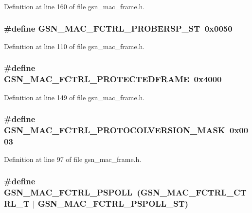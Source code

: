 Definition at line 160 of file gsn\_\-mac\_\-frame.h.

\hypertarget{a00523_a3fb1b989d878e7430e1b10bde689a86f}{
\subsubsection[{GSN\_\-MAC\_\-FCTRL\_\-PROBERSP\_\-ST}]{\setlength{\rightskip}{0pt plus 5cm}\#define GSN\_\-MAC\_\-FCTRL\_\-PROBERSP\_\-ST~0x0050}}
\label{a00523_a3fb1b989d878e7430e1b10bde689a86f}


Definition at line 110 of file gsn\_\-mac\_\-frame.h.

\hypertarget{a00523_ac867e059be49e2b75f04b83c2807774b}{
\subsubsection[{GSN\_\-MAC\_\-FCTRL\_\-PROTECTEDFRAME}]{\setlength{\rightskip}{0pt plus 5cm}\#define GSN\_\-MAC\_\-FCTRL\_\-PROTECTEDFRAME~0x4000}}
\label{a00523_ac867e059be49e2b75f04b83c2807774b}


Definition at line 149 of file gsn\_\-mac\_\-frame.h.

\hypertarget{a00523_a32b345e4167252b590258b256c497ed7}{
\subsubsection[{GSN\_\-MAC\_\-FCTRL\_\-PROTOCOLVERSION\_\-MASK}]{\setlength{\rightskip}{0pt plus 5cm}\#define GSN\_\-MAC\_\-FCTRL\_\-PROTOCOLVERSION\_\-MASK~0x0003}}
\label{a00523_a32b345e4167252b590258b256c497ed7}


Definition at line 97 of file gsn\_\-mac\_\-frame.h.

\hypertarget{a00523_a0919c93de1959e718fe29eb6fbc1ef94}{
\subsubsection[{GSN\_\-MAC\_\-FCTRL\_\-PSPOLL}]{\setlength{\rightskip}{0pt plus 5cm}\#define GSN\_\-MAC\_\-FCTRL\_\-PSPOLL~(GSN\_\-MAC\_\-FCTRL\_\-CTRL\_\-T    $|$ GSN\_\-MAC\_\-FCTRL\_\-PSPOLL\_\-ST)}}
\label{a00523_a0919c93de1959e718fe29eb6fbc1ef94}


